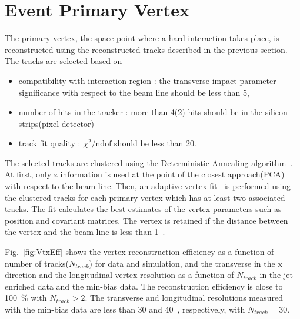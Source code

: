 \section{ Event Primary Vertex }

The primary vertex, the space point where a hard interaction takes place,
is reconstructed using the reconstructed tracks described in the previous section. 
The tracks are selected based on 
\begin{itemize}
\item compatibility with interaction region : the transverse impact parameter 
      significance with respect to the beam line should be less than 5, 
\item number of hits in the tracker : more than 4(2) hits should be 
      in the silicon strips(pixel detector) 
\item track fit quality : $\chi^2/\textrm{ndof}$ should be less than 20.
\end{itemize}
The selected tracks are clustered using the Deterministic Annealing 
algorithm~\cite{DAclustering}.
At first, only z information is used at the point of the closest approach(PCA) with 
respect to the beam line. 
Then, an adaptive vertex fit~\cite{AdaptiveVertexFit} is performed using the clustered tracks 
for each primary vertex
which has at least two associated tracks. The fit calculates the best estimates 
of the vertex parameters such as position and covariant matrices. 
The vertex is retained if the distance between the vertex and the beam line 
is less than 1~\cm.

Fig.~\ref{fig:VtxEff} shows the vertex reconstruction efficiency as a function 
of number of tracks($N_{track}$) for data and simulation, 
and the transverse in the x direction and the longitudinal vertex resolution 
as a function of $N_{track}$ in the jet-enriched data and the min-bias data. 
The reconstruction efficiency is close to 100~\% with  
$N_{track}>2$. The transverse and longitudinal resolutions measured with 
the min-bias data are less than 30 and 40~\um, respectively, with $N_{track}=30$.

